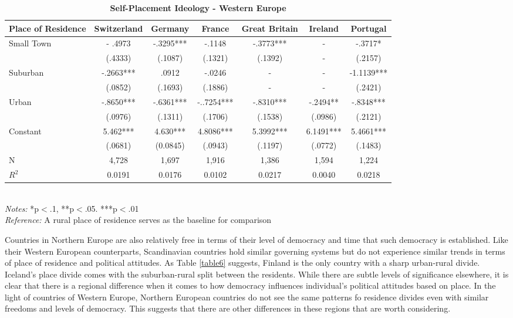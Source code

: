 \documentclass[12pt, titlepage]{article}
\newcommand\e{\emph}
\newcommand\tb{\textbf}
\begin{document}
\begin{landscape}
	\begin{table}
		\centering
		\def\arraystretch{1.5}
		\caption{\tb{Self-Placement Ideology - Western Europe}}
		\begin{tabulary}{\linewidth}{l c c c c c c}
			\\
			\hline
			\tb{Place of Residence}&\tb{Switzerland}&\tb{Germany}&\tb{France} &\tb{Great Britain}&\tb{Ireland}&\tb{Portugal}\\
			\hline
			Small Town   & - .4973  & -.3295*** &-.1148 &  -.3773***  & -   &-.3717* \\      
			& (.4333)  & (.1087)  & (.1321)    & (.1392)  &- & (.2157) \\
			Suburban  & -.2663***   & .0912 & -.0246  & -      &-    & -1.1139*** \\ 
			& (.0852)  & (.1693)  & (.1886)   & -      & - & (.2421)  \\
			Urban  & -.8650***  & -.6361*** & -..7254***  & -.8310***      &-.2494**& -.8348***   \\
			& (.0976)  &(.1311)  & (.1706)    & (.1538)   & (.0986)  & (.2121)  \\
			Constant & 5.462***  & 4.630***  & 4.8086***  & 5.3992***  & 6.1491***  &5.4661***   \\
			&(.0681)&(0.0845)&(.0943)&(.1197)&(.0772)&(.1483) \\
			N  & 4,728    &1,697  & 1,916  & 1,386     &  1,594  &1,224  \\
			$R^2$  & 0.0191    &0.0176 &0.0102    &0.0217  &  0.0040 &0.0218  \\
			\hline                                       
		\end{tabulary} 
		\\
		\e{Notes:} *p$<$.1, **p$<$.05. ***p$<$.01 \\
		\e{Reference:} A rural place of residence serves as the baseline for comparison
		\label{table5}
	\end{table}
\end{landscape}

Countries in Northern Europe are also relatively free in terms of their level of democracy and time that such democracy is established. Like their Western European counterparts, Scandinavian countries hold similar governing systems but do not experience similar trends in terms of place of residence and political attitudes. As Table \ref{table6} suggests, Finland is the only country with a sharp urban-rural divide. Iceland's place divide comes with the suburban-rural split between the residents. While there are subtle levels of significance elsewhere, it is clear that there is a regional difference when it comes to how democracy influences individual's political attitudes based on place. In the light of countries of Western Europe, Northern European countries do not see the same patterns fo residence divides even with similar freedoms and levels of democracy. This suggests that there are other differences in these regions that are worth considering.
\end{document}
